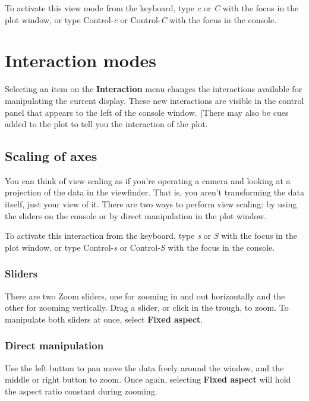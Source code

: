 \documentclass[11pt]{article}
\def\Widget#1{\textbf{#1}}
\begin{document}
To activate this view mode from the keyboard, type {\em c} or {\em C}
with the focus in the plot window, or type Control-{\em c} or
Control-{\em C} with the focus in the console.

\section{Interaction modes}
\label{slbl:InteractionModes}

Selecting an item on the \Widget{Interaction} menu changes the
interactions available for manipulating the current display.  These
new interactions are visible in the control panel that appears to the
left of the console window.  (There may also be cues added to the plot
to tell you the interaction of the plot.

\subsection{Scaling of axes}
\label{slbl:Scaling}

You can think of view scaling as if you're operating a camera and
looking at a projection of the data in the viewfinder.  That is, you
aren't transforming the data itself, just your view of it.  There are
two ways to perform view scaling: by using the sliders on the console
or by direct manipulation in the plot window.

To activate this interaction from the keyboard, type {\em s} or
{\em S} with the focus in the plot window, or type Control-{\em s} or
Control-{\em S} with the focus in the console.

\subsubsection{Sliders}

There are two Zoom sliders, one for zooming in and out horizontally
and the other for zooming vertically.  Drag a slider, or click in the
trough, to zoom.  To manipulate both sliders at once, select
\Widget{Fixed aspect}.

\subsubsection{Direct manipulation}

Use the left button to pan move the data freely around the window, and
the middle or right button to zoom.  Once again, selecting
\Widget{Fixed aspect} will hold the aspect ratio constant during
zooming.
\end{document}
